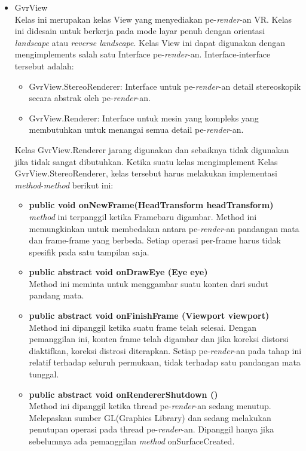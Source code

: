 \begin{itemize}
	\item GvrView\\
	Kelas ini merupakan kelas View yang menyediakan pe-\textit{render}-an VR. Kelas ini didesain untuk berkerja pada mode layar penuh dengan orientasi \textit{landscape} atau \textit{reverse landscape}. Kelas View ini dapat digunakan dengan mengimplements salah satu Interface pe-\textit{render}-an. Interface-interface tersebut adalah:
	\begin{itemize}
		\item GvrView.StereoRenderer: Interface untuk pe-\textit{render}-an detail stereoskopik secara abstrak oleh pe-\textit{render}-an.
		\item GvrView.Renderer: Interface untuk mesin yang kompleks yang membutuhkan untuk menangai semua detail pe-\textit{render}-an.
	\end{itemize}
Kelas GvrView.Renderer jarang digunakan dan sebaiknya tidak digunakan jika tidak sangat dibutuhkan.
Ketika suatu kelas mengimplement Kelas GvrView.StereoRenderer, kelas tersebut harus melakukan implementasi \textit{method}-\textit{method} berikut ini:
\begin{itemize}
	\item \textbf{public void onNewFrame(HeadTransform headTransform)}\\
	\textit{method} ini terpanggil ketika Framebaru digambar. Method ini memungkinkan untuk membedakan antara pe-\textit{render}-an pandangan mata dan frame-frame yang berbeda. Setiap operasi per-frame harus tidak spesifik pada satu tampilan saja.
	\item \textbf{public abstract void onDrawEye (Eye eye)}\\
	Method ini meminta untuk menggambar suatu konten dari sudut pandang mata.
	\item \textbf{public abstract void onFinishFrame (Viewport viewport)}\\
	Method ini dipanggil ketika suatu frame telah selesai. Dengan pemanggilan ini, konten frame telah digambar dan jika koreksi distorsi diaktifkan, koreksi \textit{}distrosi diterapkan. Setiap pe-\textit{render}-an pada tahap ini relatif terhadap seluruh permukaan, tidak terhadap satu pandangan mata tunggal. 
	\item \textbf{public abstract void onRendererShutdown ()}\\
	Method ini dipanggil ketika thread pe-\textit{render}-an sedang menutup. Melepaskan sumber GL(Graphics Library) dan sedang melakukan penutupan operasi pada thread pe-\textit{render}-an. Dipanggil hanya jika sebelumnya ada pemanggilan \textit{method} onSurfaceCreated.

\end{itemize}
\end{itemize}
